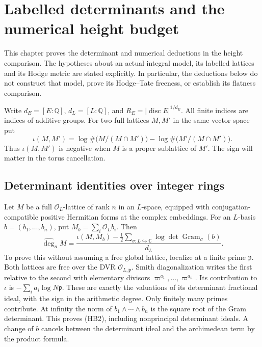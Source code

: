 \section{Labelled determinants and the numerical height budget}
\label{sec:sr-labelled-height-budget}

This chapter proves the determinant and numerical deductions in the
height comparison.  The hypotheses about an actual integral model,
its labelled lattices and its Hodge metric are stated explicitly.
In particular, the deductions below do not construct that model,
prove its Hodge--Tate freeness, or establish its flatness comparison.

Write \(d_E=[E:\mathbb Q]\), \(d_L=[L:\mathbb Q]\), and
\(R_E=|\operatorname{disc}E|^{1/d_E}\).
All finite indices are indices of additive groups.
For two full lattices \(M,M'\) in the same vector space put
\[
 \iota(M,M')=
 \log\#\bigl(M/(M\cap M')\bigr)
 -\log\#\bigl(M'/(M\cap M')\bigr).
 \tag{HB1}\label{eq:sr-hb-signed-index}
\]
Thus \(\iota(M,M')\) is negative when \(M\) is a proper
sublattice of \(M'\).  The sign will matter in the torus cancellation.

\subsection{Determinant identities over integer rings}

Let \(M\) be a full \(\mathcal O_L\)-lattice of rank \(n\)
in an \(L\)-space, equipped with conjugation-compatible positive
Hermitian forms at the complex embeddings.
For an \(L\)-basis \(b=(b_1,\ldots,b_n)\), put
\(M_b=\sum_i\mathcal O_Lb_i\).  Then
\[
 \widehat{\deg}_n M
 =\frac{\iota(M,M_b)
       -\frac12\sum_{\sigma:L\hookrightarrow\mathbb C}
                 \log\det\operatorname{Gram}_{\sigma}(b)}
        {d_L}.
 \tag{HB2}\label{eq:sr-hb-degree-index}
\]
To prove this without assuming a free global lattice, localize
at a finite prime \(\mathfrak p\).  Both lattices are free over
the DVR \(\mathcal O_{L,\mathfrak p}\).
Smith diagonalization writes the first relative to the second
with elementary divisors \(\varpi^{a_1},\ldots,\varpi^{a_n}\).
Its contribution to \(\iota\) is
\(-\sum_i a_i\log N\mathfrak p\).
These are exactly the valuations of its determinant fractional
ideal, with the sign in the arithmetic degree.
Only finitely many primes contribute.
At infinity the norm of \(b_1\wedge\cdots\wedge b_n\)
is the square root of the Gram determinant.
This proves (HB2), including nonprincipal determinant ideals.
A change of \(b\) cancels between the determinant ideal and
the archimedean term by the product formula.

